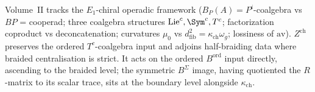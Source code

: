 \begin{remark}
\label{rem:vol2-operadic-conventions}
Volume~II tracks the $E_1$-chiral operadic framework
($B_P(A) = P^i$-coalgebra vs $BP$ = cooperad; three coalgebra
structures $\mathrm{Lie}^c, \Sym^c, T^c$; factorization coproduct vs
deconcatenation; curvatures $\mu_0$ vs $d_{\mathrm{fib}}^2 =
\kappa_{\mathrm{ch}}\omega_g$; lossiness of $\mathrm{av}$).
$Z^{\mathrm{ch}}$ preserves the ordered $T^c$-coalgebra input and
adjoins half-braiding data where braided centralisation is strict. It
acts on the ordered $B^{\mathrm{ord}}$ input directly, ascending to the
braided level; the symmetric $B^\Sigma$ image, having quotiented the
$R$-matrix to its scalar trace, sits at the boundary level alongside
$\kappa_{\mathrm{ch}}$.
\end{remark}

